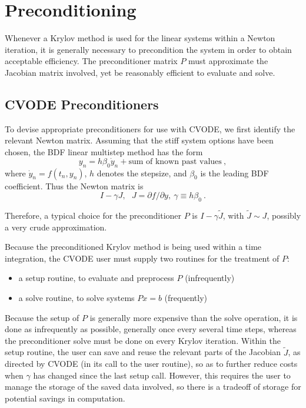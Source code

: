 \section{Preconditioning}

Whenever a Krylov method is used for the linear systems within a
Newton iteration, it is generally necessary to precondition the
system in order to obtain acceptable efficiency.  The
preconditioner matrix $P$ must approximate the Jacobian matrix
involved, yet be reasonably efficient to evaluate and solve.

\subsection{CVODE Preconditioners}

To devise appropriate preconditioners for use with CVODE, we first
identify the relevant Newton matrix.  Assuming that the stiff system
options have been chosen, the BDF linear multistep method has the form
\[ y_n = h \beta_0 \dot{y}_n + \mbox{sum of known past values} ~, \]
where $\dot{y}_n = f(t_n,y_n)$, $h$ denotes the stepsize, and
$\beta_0$ is the leading BDF coefficient.  Thus the Newton matrix is
\[ I - \gamma J,~~~ J = \partial f / \partial y,
   ~ \gamma \equiv h \beta_0 ~. \]

Therefore, a typical choice for the preconditioner $P$ is
$I - \gamma \tilde{J}$, with $\tilde{J} \sim J$, possibly a very crude
approximation.

Because the preconditioned Krylov method is being used within a time
integration, the CVODE user must supply two routines for the treatment
of $P$:
\vspace*{-.19in}
\begin{itemize}
\item a setup routine, to evaluate and preprocess $P$ (infrequently)
\item a solve routine, to solve systems $Px = b$ (frequently)
\end{itemize}
Because the setup of $P$ is generally more expensive than the solve
operation, it is done as infrequently as possible, generally once
every several time steps, whereas the preconditioner solve must be
done on every Krylov iteration.  Within the setup routine, the user
can save and reuse the relevant parts of the Jacobian $\tilde{J}$,
as directed by CVODE (in its call to the user routine), so as to
further reduce costs when $\gamma$ has changed since the last setup
call.  However, this requires the user to manage the storage of the
saved data involved, so there is a tradeoff of storage for potential
savings in computation.

